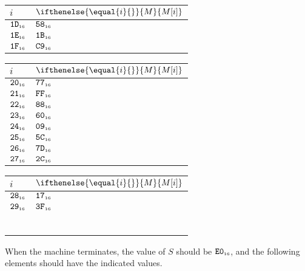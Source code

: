 \documentclass[a4paper,12pt]{article}
\makeatletter
\newcommand{\num}[1]{\texttt{#1}}
\newcommand{\hex}[1]{\num{#1}_{\textup{\tiny 16}}}
\newcommand{\MEM}[1]{\ifthenelse{\equal{#1}{}}{M}{M[#1]}}
\newcommand{\SP}{S}
\newenvironment{memtable}{%
  \begin{trivlist}
    \item
    }{%
    \end{trivlist}}
\newenvironment{memcolumn}{%
  \begin{tabular}{@{}ll@{}}
    $i$ & $\MEM{i}$ \\
    \hline}
    {%
    \hline
  \end{tabular}}
\newcommand{\memspace}{\qquad}
\makeatother
\begin{document}
\begin{memtable}
\begin{memcolumn}
    $\hex{1D}$ & $\hex{58}$ \\
    $\hex{1E}$ & $\hex{1B}$ \\
    $\hex{1F}$ & $\hex{C9}$ \\
  \end{memcolumn}
  \memspace
  \begin{memcolumn}
    $\hex{20}$ & $\hex{77}$ \\
    $\hex{21}$ & $\hex{FF}$ \\
    $\hex{22}$ & $\hex{88}$ \\
    $\hex{23}$ & $\hex{60}$ \\
    $\hex{24}$ & $\hex{09}$ \\
    $\hex{25}$ & $\hex{5C}$ \\
    $\hex{26}$ & $\hex{7D}$ \\
    $\hex{27}$ & $\hex{2C}$ \\
  \end{memcolumn}
  \memspace
  \begin{memcolumn}
    $\hex{28}$ & $\hex{17}$ \\
    $\hex{29}$ & $\hex{3F}$ \\
    \\
    \\
    \\
    \\
    \\
    \\
  \end{memcolumn}
\end{memtable}
When the machine terminates, the value of $\SP$ should be $\hex{E0}$, and the following elements should have the indicated values.
\end{document}
